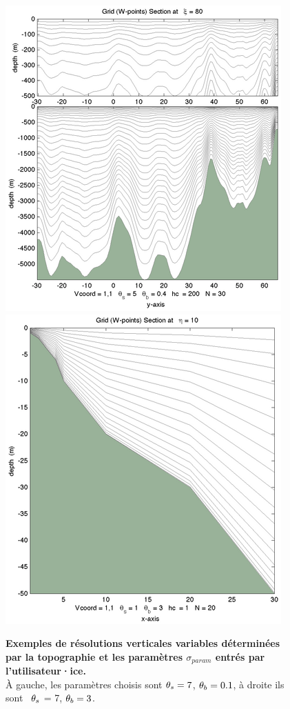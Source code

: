 \documentclass[10pt,a4paper,titlepage]{article}
\begin{document}
\begin{figure}[h!]
    \centering
    \includegraphics{../images/vcoord_ex1.png}
    \includegraphics{../images/vcoord_ex5.png}
    \caption{\textbf{Exemples de résolutions verticales variables déterminées par la topographie et les paramètres  $\sigma_{param}$ entrés par l'utilisateur·ice.} \\
        À gauche, les paramètres choisis sont  $\protect\theta_s = 7$, $\protect\theta_b = 0.1$, à droite ils sont  $\protect\theta_s$ = 7, $\protect\theta_b = 3$.}
    \label{fig:vertical_resolution}
\end{figure}
\end{document}
